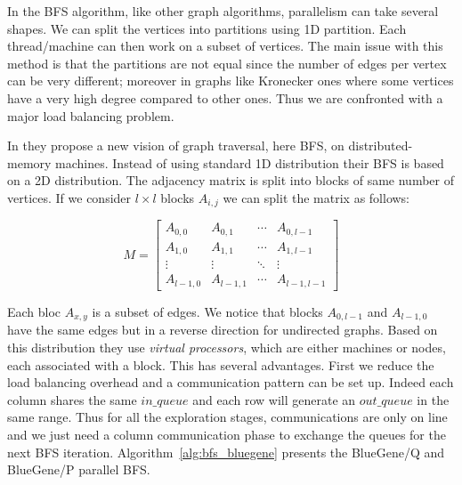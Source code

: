 In the BFS algorithm, like other graph algorithms, parallelism can take several shapes. 
We can split the vertices into partitions using 1D partition. 
Each thread/machine can then work on a subset of vertices. 
The main issue with this method is that the partitions are not equal since the number of edges per vertex can be very different; 
moreover in graphs like Kronecker ones where some vertices have a very high degree compared to other ones.
Thus we are confronted with a major load balancing problem. 

In \cite{6468459} they propose a new vision of graph traversal, here BFS, on distributed-memory machines. 
Instead of using standard 1D distribution their BFS is based on a 2D distribution. 
The adjacency matrix is split into blocks of same number of vertices.
If we consider $l\times l$ blocks $A_{i,j}$ we can split the matrix as follows:

\[ M = \left[ \begin{array}{cccc}
A_{0,0} & A_{0,1} & \cdots & A_{0,l-1} \\
A_{1,0} & A_{1,1} & \cdots & A_{1,l-1} \\
\vdots  & \vdots  & \ddots & \vdots    \\
A_{l-1,0} & A_{l-1,1}  & \cdots & A_{l-1,l-1} \end{array} \right] \] 

Each bloc $A_{x,y}$ is a subset of edges. 
We notice that blocks $A_{0,l-1}$ and $A_{l-1,0}$ have the same edges but in a reverse direction for undirected graphs. 
Based on this distribution they use \textit{virtual processors}, which are either machines or nodes, each associated with a block.
This has several advantages.
First we reduce the load balancing overhead and a communication pattern can be set up. 
Indeed each column shares the same $in\_queue$ and each row will generate an $out\_queue$ in the same range. 
Thus for all the exploration stages, communications are only on line and we just need a column communication phase to exchange the queues for the next BFS iteration.  
Algorithm~\ref{alg:bfs_bluegene} presents the BlueGene/Q and BlueGene/P parallel BFS.


